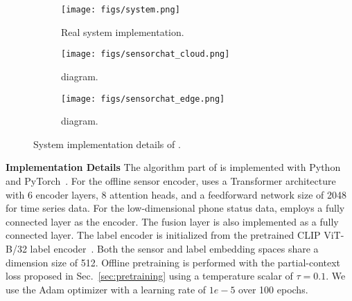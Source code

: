 \begin{figure}[t]
  \begin{subfigure}[b]{0.38\textwidth}
        \centering
        \texttt{[image: figs/system.png]}
        \vspace{-5mm}
        \caption{Real system implementation.}
        \label{fig:system_diagram}
    \end{subfigure} %
    \begin{subfigure}[b]{0.3\textwidth}
        \centering
        \texttt{[image: figs/sensorchat\_cloud.png]}
        \vspace{-5mm}
        \caption{\MethodC diagram.}
        \label{fig:sensorchat_cloud}
    \end{subfigure}
    \begin{subfigure}[b]{0.28\textwidth}
        \centering
        \texttt{[image: figs/sensorchat\_edge.png]}
        \vspace{-5mm}
        \caption{\MethodE diagram.}
        \label{fig:sensorchat_edge}
    \end{subfigure}
    \vspace{-4mm}
    \caption{System implementation details of \Method.}
    \label{fig:system}
    \vspace{-4mm}
\end{figure}


\textbf{Implementation Details}
The algorithm part of \Method is implemented with Python and PyTorch~\cite{paszke2019pytorch}.
For the offline sensor encoder, \Method uses a Transformer architecture~\cite{vaswani2017attention} with 6 encoder layers, 8 attention heads, and a feedforward network size of 2048 for time series data. For the low-dimensional phone status data, \Method employs a fully connected layer as the encoder. The fusion layer is also implemented as a fully connected layer. The label encoder is initialized from the pretrained CLIP ViT-B/32 label encoder~\cite{radford2021learning}. Both the sensor and label embedding spaces share a dimension size of 512. Offline pretraining is performed with the partial-context loss proposed in Sec.~\ref{sec:pretraining} using a temperature scalar of $\tau=0.1$. We use the Adam optimizer with a learning rate of $1e-5$ over 100 epochs.

